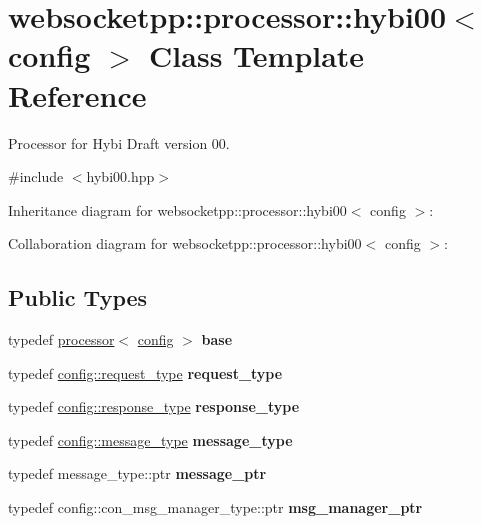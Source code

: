 \hypertarget{classwebsocketpp_1_1processor_1_1hybi00}{}\section{websocketpp\+:\+:processor\+:\+:hybi00$<$ config $>$ Class Template Reference}
\label{classwebsocketpp_1_1processor_1_1hybi00}


Processor for Hybi Draft version 00.  




{\ttfamily \#include $<$hybi00.\+hpp$>$}



Inheritance diagram for websocketpp\+:\+:processor\+:\+:hybi00$<$ config $>$\+:


Collaboration diagram for websocketpp\+:\+:processor\+:\+:hybi00$<$ config $>$\+:
\subsection*{Public Types}
\begin{DoxyCompactItemize}
\item 
\mbox{\label{classwebsocketpp_1_1processor_1_1hybi00_ae8842975f6937e834d7df16ecf5b756f}} 
typedef \mbox{\hyperlink{classwebsocketpp_1_1processor_1_1processor}{processor}}$<$ \mbox{\hyperlink{classconfig}{config}} $>$ {\bfseries base}
\item 
\mbox{\label{classwebsocketpp_1_1processor_1_1hybi00_a9992ac4efa9cc4d46ee0e9e1060cf860}} 
typedef \mbox{\hyperlink{classwebsocketpp_1_1http_1_1parser_1_1request}{config\+::request\+\_\+type}} {\bfseries request\+\_\+type}
\item 
\mbox{\label{classwebsocketpp_1_1processor_1_1hybi00_abef7fc8290a6d30e086c639d5e0b393d}} 
typedef \mbox{\hyperlink{classwebsocketpp_1_1http_1_1parser_1_1response}{config\+::response\+\_\+type}} {\bfseries response\+\_\+type}
\item 
\mbox{\label{classwebsocketpp_1_1processor_1_1hybi00_a68b8a926b9fc5fcd296cb698920280ab}} 
typedef \mbox{\hyperlink{classwebsocketpp_1_1message__buffer_1_1message}{config\+::message\+\_\+type}} {\bfseries message\+\_\+type}
\item 
\mbox{\label{classwebsocketpp_1_1processor_1_1hybi00_a300a0810d09570108e3dd747d97a8257}} 
typedef message\+\_\+type\+::ptr {\bfseries message\+\_\+ptr}
\item 
\mbox{\label{classwebsocketpp_1_1processor_1_1hybi00_aa33fb6bfdb3c905f267ba7d0c48b192e}} 
typedef config\+::con\+\_\+msg\+\_\+manager\+\_\+type\+::ptr {\bfseries msg\+\_\+manager\+\_\+ptr}
\end{DoxyCompactItemize}
